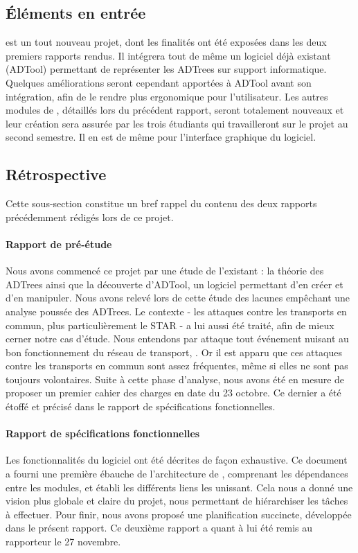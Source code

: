     \subsection{Éléments en entrée}
        \glasir{} est un tout nouveau projet, dont les finalités ont été exposées dans les deux premiers rapports rendus. Il intégrera tout de même un logiciel déjà existant (ADTool) permettant de représenter les ADTrees sur support informatique. Quelques améliorations seront cependant apportées à ADTool avant son intégration, afin de le rendre plus ergonomique pour l'utilisateur. Les autres modules de \glasir{}, détaillés lors du précédent rapport, seront totalement nouveaux et leur création sera assurée par les trois étudiants qui travailleront sur le projet au second semestre. Il en est de même pour l'interface graphique du logiciel.

    \subsection{Rétrospective} 
        Cette sous-section constitue un bref rappel du contenu des deux rapports précédemment rédigés lors de ce projet.

        \paragraph{Rapport de pré-étude} %
         Nous avons commencé ce projet par une étude de l'existant : la théorie des ADTrees ainsi que la découverte d'ADTool, un logiciel permettant d'en créer et d'en manipuler. Nous avons relevé lors de cette étude des lacunes empêchant une analyse poussée des ADTrees. Le contexte - les attaques contre les transports en commun, plus particulièrement le STAR - a lui aussi été traité, afin de mieux cerner notre cas d'étude. Nous entendons par \og attaque \fg{} tout événement nuisant au bon fonctionnement du réseau de transport,
         . Or il est apparu que ces attaques contre les transports en commun sont assez fréquentes, même si elles ne sont pas toujours volontaires. Suite à cette phase d'analyse, nous avons été en mesure de proposer un premier cahier des charges en date du 23 octobre. Ce dernier a été étoffé et précisé dans le rapport de spécifications fonctionnelles. %

        \paragraph{Rapport de spécifications fonctionnelles} %
        Les fonctionnalités du logiciel ont été décrites de façon exhaustive. Ce document a fourni une première ébauche de l'architecture de \glasir{}, comprenant les dépendances entre les modules, et établi les différents liens les unissant. Cela nous a donné une vision plus globale et claire du projet, nous permettant de hiérarchiser les tâches à effectuer. Pour finir, nous avons proposé une planification succincte, développée dans le présent rapport. Ce deuxième rapport a quant à lui été remis au rapporteur le 27 novembre.

